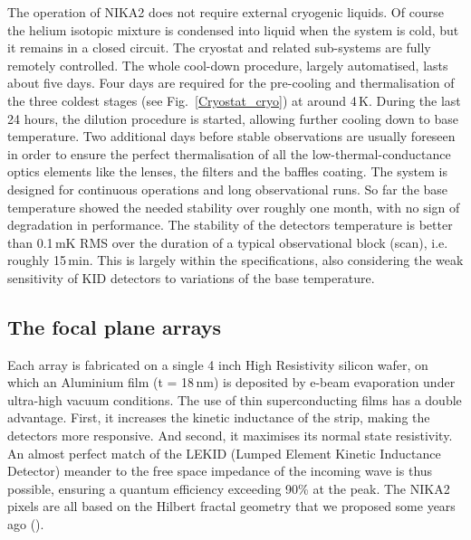 \documentclass[]{aa} %
\begin{document}
The operation of NIKA2 does not require external cryogenic liquids. Of course the helium isotopic mixture is condensed into liquid when the system is cold, but it remains in a closed circuit. The cryostat and related sub-systems are fully remotely controlled. The whole cool-down procedure, largely automatised, lasts about five days. Four days are required for the pre-cooling and thermalisation of the three coldest stages (see Fig.~\ref{Cryostat_cryo}) at around 4\,K. During the last 24 hours, the dilution procedure is started, allowing further cooling down to base temperature. Two additional days before stable observations are usually foreseen in order to ensure the perfect thermalisation of all the low-thermal-conductance optics elements like the lenses, the filters and the baffles coating. The system is designed for continuous operations and long observational runs. So far the base temperature showed the needed stability over roughly one month, with no sign of degradation in performance. The stability of the detectors temperature is better than 0.1\,mK RMS over the duration of a typical observational block (scan), i.e. roughly 15\,min. This is largely within the specifications, also considering the weak sensitivity of KID detectors to variations of the base temperature. 


 \subsection{The focal plane arrays}

Each array is fabricated on a single 4 inch High Resistivity silicon wafer, on which an Aluminium film (t = 18\,nm) is deposited by e-beam evaporation under ultra-high vacuum conditions. The use of thin superconducting films has a double advantage. First, it increases the kinetic inductance of the strip, making the detectors more responsive. And second, it maximises its normal state resistivity. An almost perfect match of the LEKID (Lumped Element Kinetic Inductance Detector) meander to the free space impedance of the incoming wave is thus possible, ensuring a quantum efficiency exceeding 90\% at the peak. The NIKA2 pixels are all based on the Hilbert fractal geometry that we proposed some years ago (\cite{Roesch2012}). 
\end{document}
